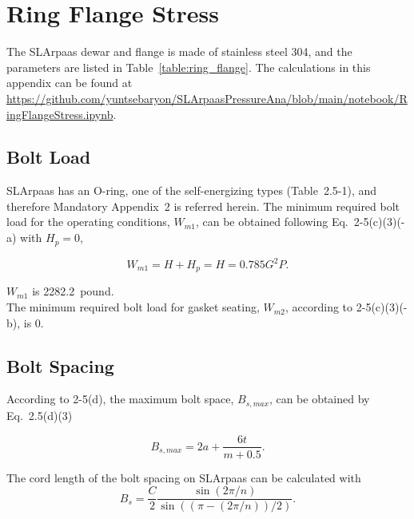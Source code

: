 \section{Ring Flange Stress}
\label{app:ring_flange}


The SLArpaas dewar and flange is made of stainless steel 304,
and the parameters are listed in Table~\ref{table:ring_flange}.
The calculations in this appendix can be found at
\url{https://github.com/yuntsebaryon/SLArpaasPressureAna/blob/main/notebook/RingFlangeStress.ipynb}.\\



\subsection{Bolt Load}
\label{app:bolt_load}

SLArpaas has an O-ring, one of the self-energizing types (Table~2.5-1),
and therefore Mandatory Appendix~2 is referred herein.
The minimum required bolt load for the operating conditions,
$W_{m1}$, can be obtained following Eq.~2-5(c)(3)(-a) with $H_p = 0$,

\begin{equation}
    W_{m1} = H + H_p = H = 0.785G^2 P.
\end{equation}

$W_{m1}$ is 2282.2~pound.\\

The minimum required bolt load for gasket seating, $W_{m2}$, according to
2-5(c)(3)(-b), is 0.

\subsection{Bolt Spacing}
\label{app:bolt_spacing}

According to 2-5(d), the maximum bolt space, $B_{s,max}$, can be obtained
by Eq.~2.5(d)(3)

\begin{equation}
    B_{s,max} = 2a + \frac{6t}{m+0.5}.
\end{equation}

The cord length of the bolt spacing on SLArpaas can be calculated with
\begin{equation}
    B_s = \frac{C}{2}\frac{\sin(2\pi/n)}{\sin((\pi-(2\pi/n))/2)}.
\end{equation}

